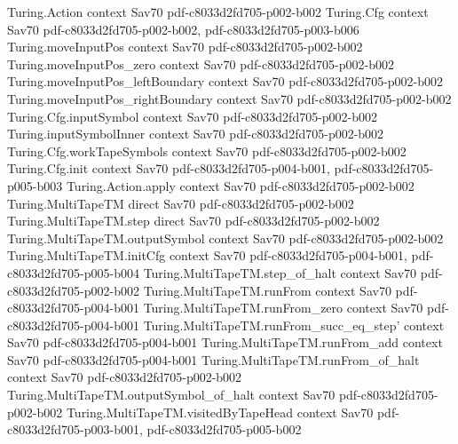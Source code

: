 \begin{theorem}
\label{Complexity.savitch}
\leanok
\proofstep
  {Turing.Action}
  {context}
  {Sav70}
  {pdf-c8033d2fd705-p002-b002}
\proofstep
  {Turing.Cfg}
  {context}
  {Sav70}
  {pdf-c8033d2fd705-p002-b002,
    pdf-c8033d2fd705-p003-b006}
\proofstep
  {Turing.moveInputPos}
  {context}
  {Sav70}
  {pdf-c8033d2fd705-p002-b002}
\proofstep
  {Turing.moveInputPos_zero}
  {context}
  {Sav70}
  {pdf-c8033d2fd705-p002-b002}
\proofstep
  {Turing.moveInputPos_leftBoundary}
  {context}
  {Sav70}
  {pdf-c8033d2fd705-p002-b002}
\proofstep
  {Turing.moveInputPos_rightBoundary}
  {context}
  {Sav70}
  {pdf-c8033d2fd705-p002-b002}
\proofstep
  {Turing.Cfg.inputSymbol}
  {context}
  {Sav70}
  {pdf-c8033d2fd705-p002-b002}
\proofstep
  {Turing.inputSymbolInner}
  {context}
  {Sav70}
  {pdf-c8033d2fd705-p002-b002}
\proofstep
  {Turing.Cfg.workTapeSymbols}
  {context}
  {Sav70}
  {pdf-c8033d2fd705-p002-b002}
\proofstep
  {Turing.Cfg.init}
  {context}
  {Sav70}
  {pdf-c8033d2fd705-p004-b001,
    pdf-c8033d2fd705-p005-b003}
\proofstep
  {Turing.Action.apply}
  {context}
  {Sav70}
  {pdf-c8033d2fd705-p002-b002}
\proofstep
  {Turing.MultiTapeTM}
  {direct}
  {Sav70}
  {pdf-c8033d2fd705-p002-b002}
\proofstep
  {Turing.MultiTapeTM.step}
  {direct}
  {Sav70}
  {pdf-c8033d2fd705-p002-b002}
\proofstep
  {Turing.MultiTapeTM.outputSymbol}
  {context}
  {Sav70}
  {pdf-c8033d2fd705-p002-b002}
\proofstep
  {Turing.MultiTapeTM.initCfg}
  {context}
  {Sav70}
  {pdf-c8033d2fd705-p004-b001,
    pdf-c8033d2fd705-p005-b004}
\proofstep
  {Turing.MultiTapeTM.step_of_halt}
  {context}
  {Sav70}
  {pdf-c8033d2fd705-p002-b002}
\proofstep
  {Turing.MultiTapeTM.runFrom}
  {context}
  {Sav70}
  {pdf-c8033d2fd705-p004-b001}
\proofstep
  {Turing.MultiTapeTM.runFrom_zero}
  {context}
  {Sav70}
  {pdf-c8033d2fd705-p004-b001}
\proofstep
  {Turing.MultiTapeTM.runFrom_succ_eq_step'}
  {context}
  {Sav70}
  {pdf-c8033d2fd705-p004-b001}
\proofstep
  {Turing.MultiTapeTM.runFrom_add}
  {context}
  {Sav70}
  {pdf-c8033d2fd705-p004-b001}
\proofstep
  {Turing.MultiTapeTM.runFrom_of_halt}
  {context}
  {Sav70}
  {pdf-c8033d2fd705-p002-b002}
\proofstep
  {Turing.MultiTapeTM.outputSymbol_of_halt}
  {context}
  {Sav70}
  {pdf-c8033d2fd705-p002-b002}
\proofstep
  {Turing.MultiTapeTM.visitedByTapeHead}
  {context}
  {Sav70}
  {pdf-c8033d2fd705-p003-b001,
    pdf-c8033d2fd705-p005-b002}

\end{theorem}
